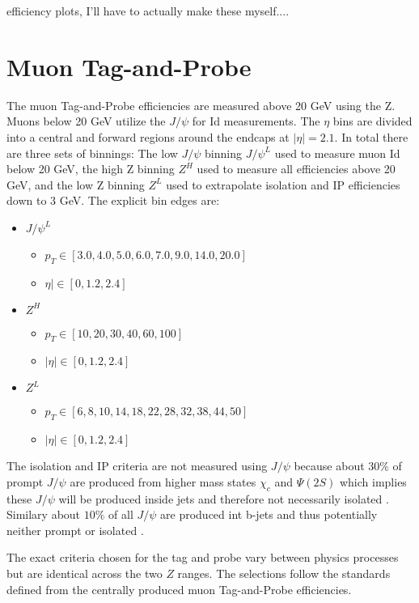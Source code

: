 efficiency plots, I'll have to actually make these myself....

\section{Muon Tag-and-Probe}

The muon Tag-and-Probe efficiencies are measured above 20 GeV using the Z. Muons below 20 GeV utilize the $J/\psi$ for Id measurements. The $\eta$ bins are divided into a central and forward regions around the endcaps at $|\eta| = 2.1$. In total there are three sets of binnings: The low \pt $J/\psi$ binning $J/\psi^{L}$ used to measure muon Id below 20 GeV, the high \pt Z binning $Z^{H}$ used to measure all efficiencies above 20 GeV, and the low \pt Z binning $Z^{L}$ used to extrapolate isolation and IP efficiencies down to 3 GeV.
The explicit bin edges are:
\begin{itemize}
\item $J/\psi^{L}$  
	\begin{itemize}
		\item[] $p_T \in [3.0, 4.0,  5.0, 6.0, 7.0, 9.0, 14.0,  20.0]$
		\item[]  $\eta| \in [0, 1.2, 2.4]$
	\end{itemize}
\item $Z^{H}$
	\begin{itemize}
		\item[] $ p_T \in [10, 20, 30, 40, 60, 100]$
		\item[] $|\eta| \in [ 0, 1.2, 2.4]$
	\end{itemize}
\item $Z^{L}$
	\begin{itemize}
		\item[] $ p_T \in [6,8,10,14,18,22,28,32,38,44,50]$ 
		\item[] $|\eta| \in [0, 1.2, 2.4]$
	\end{itemize}
\end{itemize}

The isolation and IP criteria are not measured using $J/\psi$ because about $30\%$ of prompt $J/\psi$ are produced from higher mass states $\chi_c$ and $\Psi(2S)$  which implies these $J/\psi$ will be produced inside jets and therefore not necessarily isolated \cite{Lansberg:2006dh}. Similary about $10\%$ of all $J/\psi$ are produced int b-jets and thus potentially neither prompt or isolated \cite{LHCb:2013itw}.

The exact criteria chosen for the tag and probe vary between physics processes but are identical across the two $Z$ ranges. The selections follow the standards defined from the centrally produced muon Tag-and-Probe efficiencies.\\

